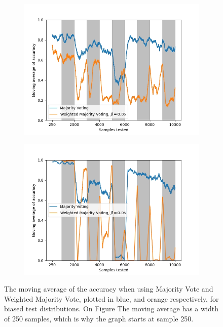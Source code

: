 \begin{figure}
    \begin{subfigure}{.5\textwidth}
        \centering
        \includegraphics[width=\linewidth]{figures/biased-test-1.jpg}
        \caption{}
        \label{fig:biased-test-a}
    \end{subfigure}
    \begin{subfigure}{.5\textwidth}
        \centering
        \includegraphics[width=\linewidth]{figures/biased-test-2.jpg}
        \caption{}
        \label{fig:biased-test-b}
    \end{subfigure}
    \caption{The moving average of the accuracy when using Majority Vote and Weighted Majority Vote, plotted in blue, and orange respectively, for biased test distributions. On Figure The moving average has a width of 250 samples, which is why the graph starts at sample 250.}
\end{figure} \label{fig:biased-test}

